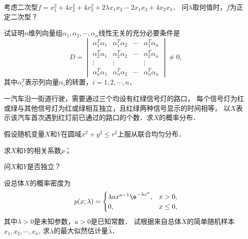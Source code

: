 \documentclass[plain,noanswer,medmath]{../../template/jnuexam}
\begin{document}

\begin{problem}
考虑二次型$f = x_1^2+ 4x_2^2+ 4x_3^2+ 2\lambda x_1x_2 - 2x_1x_3 + 4x_2x_3$．
问$\lambda$取何值时，$f$为正定二次型？
\end{problem}



\begin{problem}
试证明$n$维列向量组$\alpha_1,\alpha_2, \cdots ,\alpha_n$线性无关的充分必要条件是
$$D = \begin{vmatrix}
  \alpha_1^T\alpha_1 & \alpha_1^T\alpha_2 & \cdots & \alpha_1^T\alpha_n \\
  \alpha_2^T\alpha_1 & \alpha_2^T\alpha_2 & \cdots & \alpha_2^T\alpha_n \\
              \vdots &             \vdots &        & \vdots \\
  \alpha_n^T\alpha_1 & \alpha_n^T\alpha_2 & \cdots & \alpha_n^T\alpha_n
\end{vmatrix} \ne 0,$$
其中$\alpha_i^T$表示列向量$\alpha_i$的转置，$i = 1,2, \cdots ,n$．
\end{problem}



\begin{problem}
一汽车沿一街道行驶，需要通过三个均设有红绿信号灯的路口，
每个信号灯为红或绿与其他信号灯为红或绿相互独立，且红绿两种信号显示的时间相等，
以$X$表示该汽车首次遇到红灯前已通过的路口的个数．求$X$的概率分布．
\end{problem}



\begin{problem}
假设随机变量$X$和$Y$在圆域$x^2 + y^2 \le r^2$上服从联合均匀分布．\par
\begin{enumerate*}
\item 求$X$和$Y$的相关系数$\rho$；
\item 问$X$和$Y$是否独立？
\end{enumerate*}
\end{problem}



\begin{problem}
设总体$X$的概率密度为
$$p(x;\lambda) = \begin{cases}
  \lambda ax^{a-1}\e^{-\lambda x^a}, & x > 0, \\
                                  0, & x \le 0,
\end{cases}$$
其中$\lambda > 0$是未知参数，$a > 0$是已知常数．
试根据来自总体$X$的简单随机样本$x_1,x_2, \cdots ,x_n$,
求$\lambda$的最大似然估计量$\hat{\lambda}$．
\end{problem}
\end{document}
